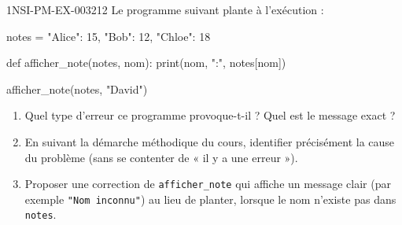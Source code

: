 \begin{exercice}{1NSI-PM-EX-003}{2}{12}
Le programme suivant plante à l'exécution :
\begin{python}
notes = {"Alice": 15, "Bob": 12, "Chloe": 18}

def afficher_note(notes, nom):
    print(nom, ":", notes[nom])

afficher_note(notes, "David")
\end{python}
\begin{enumerate}
  \item Quel type d'erreur ce programme provoque-t-il ? Quel est le message exact ?
  \item En suivant la démarche méthodique du cours, identifier précisément la cause du problème (sans se contenter de « il y a une erreur »).
  \item Proposer une correction de \lstinline{afficher_note} qui affiche un message clair (par exemple \lstinline{"Nom inconnu"}) au lieu de planter, lorsque le nom n'existe pas dans \lstinline{notes}.
\end{enumerate}
\end{exercice}
